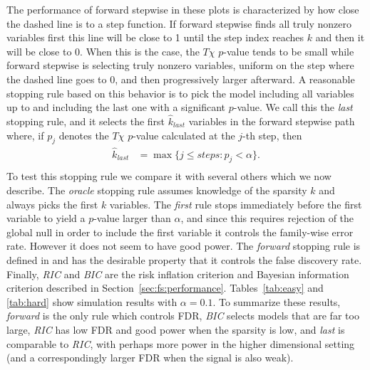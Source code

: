 \documentclass{imsart}
\begin{document}
The performance of forward stepwise in these plots is characterized by how
close the dashed line is to a step function. If forward stepwise finds all
truly nonzero variables first this line will be close to 1 until the step
index reaches $k$ and then it will be close to 0. When this is the case,
the $T\chi$ $p$-value tends to be small while forward stepwise is selecting truly
nonzero variables, uniform on the step where the dashed line goes to 0,
and then progressively larger afterward. A reasonable stopping rule based
on this behavior is to pick the model including all variables up to and
including the last one with a significant $p$-value. We call this the
\textit{last} stopping rule, and it selects the first $\hat k_\textit{last}$
variables in the forward stepwise path where, if
$p_j$ denotes the $T\chi$ $p$-value calculated at the $j$-th step, then
\begin{equation}
  \label{eq:klast}
  \begin{aligned}
    \hat k_\textit{last} & = \max \{ j \leq steps : p_j < \alpha \}. \\
  \end{aligned}
\end{equation}
To test this stopping rule we compare it with several others which we now
describe. The \textit{oracle} stopping rule assumes knowledge of the
sparsity $k$ and always picks the first $k$ variables. The \textit{first}
rule stops immediately before the first variable to yield a $p$-value
larger than $\alpha$, and since this requires rejection of the global 
null in order to include the first variable
it controls the family-wise error rate. However it does not seem to have
good power.
The \textit{forward}
stopping rule is defined in \cite{sequential:fdr} and has the desirable
property that it controls the false discovery rate. Finally, \textit{RIC}
and \textit{BIC}
are the risk inflation criterion and Bayesian information criterion
described in Section~\ref{sec:fs:performance}. Tables~\ref{tab:easy} and
\ref{tab:hard} show simulation results with $\alpha = 0.1$.
To summarize these results, \textit{forward} is the only rule which
controls FDR, \textit{BIC} selects models that are far too large,
\textit{RIC} has low FDR and good power when the sparsity is low,
and \textit{last} is comparable to \textit{RIC},
with perhaps more power in the higher dimensional setting
(and a correspondingly larger FDR when the signal is also weak).




\end{document}
